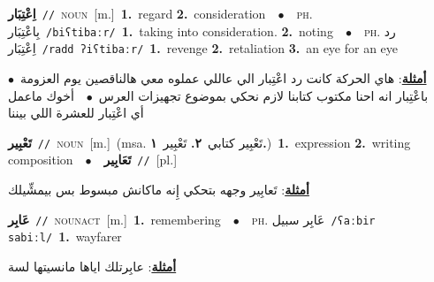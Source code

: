\documentclass[10pt,a4paper,twoside]{article} %
\begin{document}
\begin{multicols}{2}
{\setlength\topsep{0pt}\textbf{\foreignlanguage{arabic}{اِعْتِبَار}}\ {\color{gray}\texttt{//}\color{black}}\ \textsc{noun}\ [m.]\ \textbf{1.}~regard  \textbf{2.}~consideration\ \ $\bullet$\ \ \textsc{ph.} \color{gray} \foreignlanguage{arabic}{بِاعْتِبَار}\color{black}\ {\color{gray}\texttt{/{\sffamily biʕtibaːr}/}\color{black}}\ \textbf{1.}~taking into consideration.  \textbf{2.}~noting\ \ $\bullet$\ \ \textsc{ph.} \color{gray} \foreignlanguage{arabic}{رد اِعْتِبَار}\color{black}\ {\color{gray}\texttt{/{\sffamily radd ʔiʕtibaːr}/}\color{black}}\ \textbf{1.}~revenge  \textbf{2.}~retaliation  \textbf{3.}~an eye for an eye\  \begin{flushright}\color{gray}\foreignlanguage{arabic}{\textbf{\underline{\foreignlanguage{arabic}{أمثلة}}}: هاي الحركة كانت رد اعْتِبار الي عاللي عملوه معي هالناقصين يوم العزومة\ $\bullet$\ \  باعْتِبار انه احنا مكتوب كتابنا لازم نحكي بموضوع تجهيزات العرس\ $\bullet$\ \  أخوك ماعمل أي اعْتِبار للعشرة اللي بيننا}\end{flushright}\color{black}} \vspace{2mm}

{\setlength\topsep{0pt}\textbf{\foreignlanguage{arabic}{تَعْبِير}}\ {\color{gray}\texttt{//}\color{black}}\ \textsc{noun}\ [m.]\ \color{gray}(msa. \foreignlanguage{arabic}{تَعْبِير كتابي}~\foreignlanguage{arabic}{\textbf{٢.}}  \foreignlanguage{arabic}{تَعْبِير}~\foreignlanguage{arabic}{\textbf{١.}})\color{black}\ \textbf{1.}~expression  \textbf{2.}~writing composition\ \ $\bullet$\ \ \setlength\topsep{0pt}\textbf{\foreignlanguage{arabic}{تَعَابِير}}\ {\color{gray}\texttt{//}\color{black}}\ [pl.]\  \begin{flushright}\color{gray}\foreignlanguage{arabic}{\textbf{\underline{\foreignlanguage{arabic}{أمثلة}}}: تَعابِير وجهه بتحكي إِنه ماكانش مبسوط بس بيمشِّيلك}\end{flushright}\color{black}} \vspace{2mm}

{\setlength\topsep{0pt}\textbf{\foreignlanguage{arabic}{عَابِر}}\ {\color{gray}\texttt{//}\color{black}}\ \textsc{noun\textunderscore act}\ [m.]\ \textbf{1.}~remembering\ \ $\bullet$\ \ \textsc{ph.} \color{gray} \foreignlanguage{arabic}{عَابِر سبيل}\color{black}\ {\color{gray}\texttt{/{\sffamily ʕaːbir sabiːl}/}\color{black}}\ \textbf{1.}~wayfarer\  \begin{flushright}\color{gray}\foreignlanguage{arabic}{\textbf{\underline{\foreignlanguage{arabic}{أمثلة}}}: عابِرتلك اياها مانسيتها لسة}\end{flushright}\color{black}} \vspace{2mm}


\end{multicols}
\end{document}
